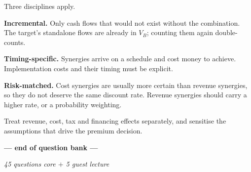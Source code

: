 \documentclass[11pt,a4paper]{article}
\begin{document}
\begin{soln}
Three disciplines apply.\par
\textbf{Incremental.} Only cash flows that would not exist without the combination.
The target's standalone flows are already in $V_B$; counting them again double-counts.\par
\textbf{Timing-specific.} Synergies arrive on a schedule and cost money to achieve.
Implementation costs and their timing must be explicit.\par
\textbf{Risk-matched.} Cost synergies are usually more certain than revenue synergies,
so they do not deserve the same discount rate. Revenue synergies should carry a higher
rate, or a probability weighting.\par
Treat revenue, cost, tax and financing effects separately, and sensitise the
assumptions that drive the premium decision.
\end{soln}

\vspace{8mm}
\begin{center}
{\color{inkred}\bfseries\large --- end of question bank ---}\par\vspace{2mm}
{\color{pencil}\itshape 45 questions \quad\textbar{} core $+$ 5 guest lecture}
\end{center}
\end{document}
